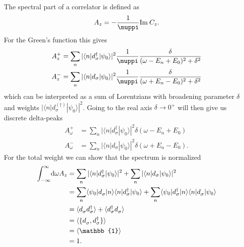 The spectral part of a correlator is defined as
\begin{align}
    A_z = -\frac{1}{\muppi}\Im C_z.
\end{align}
For the Green's function this gives
\begin{subequations}
    \begin{align}
        A^+_z
         & =
        \sum_n |\langle n | d_\sigma^\dag | \psi_0\rangle|^2 \frac{1}{\muppi} \frac{\delta}{(\omega - E_n + E_0)^2 + \delta^2} \\
        A^-_z
         & =
        \sum_n |\langle n | d_\sigma | \psi_0\rangle|^2 \frac{1}{\muppi} \frac{\delta}{(\omega + E_n - E_0)^2 + \delta^2}
    \end{align}
\end{subequations}
which can be interpreted as a sum of Lorentzians with broadening parameter $\delta$
and weights $|\langle n | d_\sigma^{(\dag)} | \psi_0\rangle|^2$.
Going to the real axis $\delta\rightarrow0^+$ will then give us discrete delta-peaks
\begin{subequations}
    \begin{align}
        A^+_\omega
         & =
        \sum_n |\langle n | d_\sigma^\dag | \psi_0\rangle|^2 \delta(\omega - E_n + E_0) \\
        A^-_\omega
         & =
        \sum_n |\langle n | d_\sigma | \psi_0\rangle|^2 \delta(\omega + E_n - E_0).
    \end{align}
\end{subequations}
For the total weight we can show that the spectrum is normalized
\begin{align}
    \int_{-\infty}^\infty\! \md\omega A_z
     & =
    \sum_n |\langle n | d_\sigma^\dag | \psi_0\rangle|^2
    + \sum_n |\langle n | d_\sigma | \psi_0\rangle|^2                                              \\
     & =
    \sum_n \langle \psi_0 | d_\sigma^{\pdag} | n\rangle\langle n | d_\sigma^\dag | \psi_0\rangle
    + \sum_n \langle \psi_0 | d_\sigma^\dag | n\rangle\langle n | d_\sigma^{\pdag} | \psi_0\rangle \\
     & =
    \langle d_\sigma^{\pdag} d_\sigma^\dag\rangle + \langle d_\sigma^\dag d_\sigma^{\pdag}\rangle  \\
     & =
    \langle \{d_\sigma^{\pdag}, d_\sigma^\dag\}\rangle                                             \\
     & =
    \langle \mathbb{1}\rangle                                                                      \\
     & =
    1.
\end{align}

